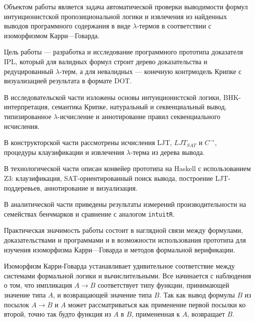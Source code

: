 \documentclass[14pt, russian]{scrartcl}
\begin{document}

\setlength{\tabcolsep}{3pt}
\newpage
\setcounter{page}{2}

Объектом работы является задача автоматической проверки выводимости формул
интуиционистской пропозициональной логики и извлечения из найденных выводов
программного содержания в виде $\lambda$-термов в соответствии с изоморфизмом
Карри---Говарда.

Цель работы --- разработка и исследование программного прототипа доказателя IPL,
который для валидных формул строит дерево доказательства и редуцированный
$\lambda$-терм, а для невалидных --- конечную контрмодель Крипке с визуализацией
результата в формате DOT.

В исследовательской части изложены основы интуиционистской логики, BHK-интерпретация,
семантика Крипке, натуральный и секвенциальный вывод, типизированное
$\lambda$-исчисление и аннотирование правил секвенциального исчисления.

В конструкторской части рассмотрены исчисления LJT, $LJT_{SAT}$ и
$C^{\rightarrow}$, процедуры клаузификации и извлечения $\lambda$-терма из
дерева вывода.

В технологической части описан конвейер прототипа на Haskell с использованием
Z3: клаузификация, SAT-ориентированный поиск вывода, построение LJT-поддеревьев,
аннотирование и визуализация.

В аналитической части приведены результаты измерений производительности на
семействах бенчмарков и сравнение с аналогом \texttt{intuitR}.

Практическая значимость работы состоит в наглядной связи между формулами,
доказательствами и программами и в возможности использования прототипа для
изучения изоморфизма Карри---Говарда и методов формальной верификации.

\newpage
\renewcommand\contentsname{\hfill{\normalfont{СОДЕРЖАНИЕ}}\hfill}  %
\tableofcontents
\newpage
{}  %

Изоморфизм Карри-Говарда устанавливает удивительное соответствие между системами
формальной логики и вычислительными.  Все начинается с наблюдения о том, что
импликация $A \rightarrow B$ соответствует типу функции, принимающей значение
типа $A$, и возвращающей значение типа $B$. Так как вывод формулы $B$ из посылок
$A \rightarrow B$ и $A$ может рассматриваться как применение первой посылки ко
второй, точно так будто функция из $A$ в $B$, примененная к $A$, возвращает $B$. 
\end{document}
